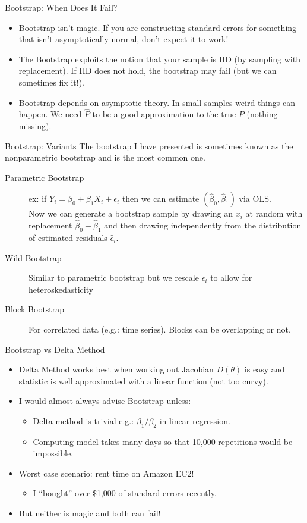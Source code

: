 \documentclass[aspectratio=169]{beamer}
\begin{document}
\begin{frame}{Bootstrap: When Does It Fail?}
\begin{itemize}
\item Bootstrap isn't magic. If you are constructing standard errors for something that isn't asymptotically normal, don't expect it to work!
\item The Bootstrap exploits the notion that your sample is IID (by sampling with replacement). If IID does not hold, the bootstrap may fail (but we can sometimes fix it!).
\item Bootstrap depends on asymptotic theory. In small samples weird things can happen. We need $\hat{P}$ to be a good approximation to the true $P$ (nothing missing).
\end{itemize}
\end{frame}

\begin{frame}{Bootstrap: Variants}
The bootstrap I have presented is sometimes known as the \alert{nonparametric bootstrap} and is the most common one.
\begin{description}
\item[Parametric Bootstrap] ex: if $Y_i = \beta_0 + \beta_1 X_i + \epsilon_i$ then we can estimate $(\hat{\beta}_0,\hat{\beta}_1)$ via OLS.\\
 Now we can generate a bootstrap sample by drawing an $x_i$ at random with replacement $\hat{\beta}_0 + \hat{\beta}_1$ and then drawing \alert{independently} from the distribution of estimated residuals $\hat{\epsilon}_i$.
 \item[Wild Bootstrap] Similar to parametric bootstrap but we rescale $\epsilon_i$ to allow for \alert{heteroskedasticity}
\item[Block Bootstrap] For correlated data (e.g.: time series). Blocks can be overlapping or not.  
\end{description}
\end{frame}

\begin{frame}{Bootstrap vs Delta Method}
\begin{itemize}
\item Delta Method works best when working out Jacobian $D(\theta)$ is easy and statistic is well approximated with a linear function (not too curvy).
\item I would almost always advise Bootstrap unless:
\begin{itemize}
\item Delta method is trivial e.g.: $\beta_1 / \beta_2$ in linear regression.
\item Computing model takes many days so that 10,000 repetitions would be impossible.
\end{itemize}
\item Worst case scenario: rent time on Amazon EC2!
\begin{itemize}
\item I ``bought'' over \$1,000 of standard errors recently.
\end{itemize}
\item But neither is magic and both can fail!
\end{itemize}
\end{frame}
\end{document}
